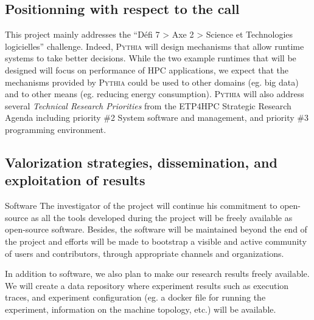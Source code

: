\documentclass[a4paper,11pt,defblank]{article}
\newcommand{\pname}{\textsc{Pythia}\xspace}
\begin{document}
\subsection{Positionning with respect to the call}

This project mainly addresses the ``Défi 7 > Axe 2 > Science et
Technologies logicielles'' challenge. Indeed, \pname will design
mechanisms that allow runtime systems to take better decisions. While
the two example runtimes that will be designed will focus on
performance of HPC applications, we expect that the mechanisms
provided by \pname could be used to other domains (eg. big data) and
to other means (eg. reducing energy consumption).
%
\pname will also address several \emph{Technical Research Priorities}
from the ETP4HPC Strategic Research Agenda \cite{etp4hpc} including priority
\#2 System software and management, and priority \#3 programming
environment.

% 


\subsection{Valorization strategies, dissemination, and exploitation of results}

\begin{paragraph}{Software}
The investigator of the project will continue his commitment to
open-source as all the tools developed during the
project will be freely available as open-source software.
%
Besides, the software will be maintained beyond the end of
the project and efforts will be made to bootstrap a visible and
active community of users and contributors, through appropriate
channels and organizations.

In addition to software, we also plan to make our research results
freely available. We will create a data repository where experiment
results such as execution traces, and experiment configuration (eg. a
docker file for running the experiment, information on the machine
topology, etc.) will be available.
\end{paragraph}
\end{document}
